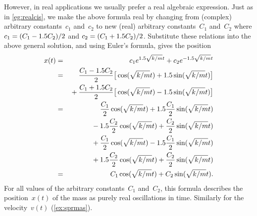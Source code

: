 \begin{reduce}
\begin{example}
\begin{solution}
However, in real applications we usually prefer a real algebraic expression.
Just as in \autoref{eg:realcis}, we make the above formula real by changing from (complex) arbitrary constants~\(c_1\) and~\(c_2\) to new (real) arbitrary constants~\(C_1\) and~\(C_2\) where \(c_1=(C_1-1.5 C_2)/2\) and \(c_2=(C_1+1.5 C_2)/2\).
Substitute these relations into the above general solution, and using Euler's formula, gives the position
\begin{eqnarray*}
x(t)&=&c_1e^{1.5\sqrt{k/m}t}+c_2e^{-1.5\sqrt{k/m}t}
\\&=&\frac{C_1-1.5 C_2}2\big[\cos(\sqrt{k/m}t)+1.5\sin(\sqrt{k/m}t)\big]
\\&&{}
+\frac{C_1+1.5 C_2}2\big[\cos(\sqrt{k/m}t)-1.5\sin(\sqrt{k/m}t)\big]
\\&=&
\frac{C_1}2\cos(\sqrt{k/m}t)+1.5\frac{C_1}2\sin(\sqrt{k/m}t)
\\&&{}
-1.5\frac{C_2}2\cos(\sqrt{k/m}t)+\frac{C_2}2\sin(\sqrt{k/m}t)
\\&&{}
+\frac{C_1}2\cos(\sqrt{k/m}t)-1.5\frac{C_1}2\sin(\sqrt{k/m}t)
\\&&{}
+1.5\frac{C_2}2\cos(\sqrt{k/m}t)+\frac{C_2}2\sin(\sqrt{k/m}t)
\\&=&C_1\cos(\sqrt{k/m}t)+C_2\sin(\sqrt{k/m}t).
\end{eqnarray*}
For all values of the arbitrary constants~\(C_1\) and~\(C_2\), this formula describes the position~\(x(t)\) of the mass as purely real oscillations in time.
Similarly for the velocity~\(v(t)\) (\autoref{ex:sprmas}).
\end{solution}
\end{example}
\end{reduce}







\begin{comment}
Probable section includes Cayley--Hamilton theorem: recall \autoref{sec:mpmev}, compute powers of matrices, then C-H.
Other applications include Markov chains.

Possibly develop a little more theory on similarity of matrices and coordinate transform of matrices.  Then Jordan form and solving non-diagonalizable systems of differential equations.

Possibly something on {Emergent quasi-stationary dynamics of metastable states} but perhaps done in 7.1.2--3. (Can one have too many buzz-words?)
\end{comment}















